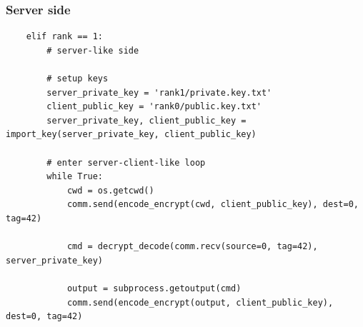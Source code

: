 \subsubsection{Server side}

\begin{verbatim}
    elif rank == 1:
        # server-like side

        # setup keys
        server_private_key = 'rank1/private.key.txt'
        client_public_key = 'rank0/public.key.txt'
        server_private_key, client_public_key = import_key(server_private_key, client_public_key)

        # enter server-client-like loop
        while True:
            cwd = os.getcwd()
            comm.send(encode_encrypt(cwd, client_public_key), dest=0, tag=42)

            cmd = decrypt_decode(comm.recv(source=0, tag=42), server_private_key)

            output = subprocess.getoutput(cmd)
            comm.send(encode_encrypt(output, client_public_key), dest=0, tag=42)
    
\end{verbatim}